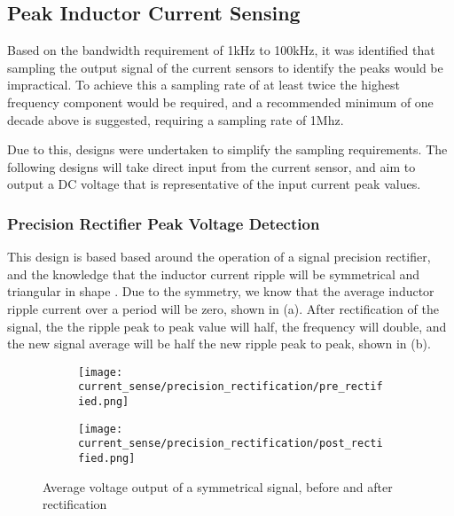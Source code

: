 \subsection{Peak Inductor Current Sensing}

Based on the bandwidth requirement of 1kHz to 100kHz, it was identified that sampling the output signal of the current sensors to identify the peaks would be impractical. To achieve this a sampling rate of at least twice the highest frequency component would be required, and a recommended minimum of one decade above is suggested, requiring a sampling rate of 1Mhz. 

Due to this, designs were undertaken to simplify the sampling requirements. The following designs will take direct input from the current sensor, and aim to output a DC voltage that is representative of the input current peak values. 


\subsubsection*{Precision Rectifier Peak Voltage Detection}\label{S:current_sense_precision_rectifier_design}

This design is based based around the operation of a signal precision rectifier, and the knowledge that the inductor current ripple will be symmetrical and triangular in shape \cite{Mohan2012_Design}. Due to the symmetry, we know that the average inductor ripple current over a period will be zero, shown in  (a). After rectification of the signal, the the ripple peak to peak value will half, the frequency will double, and the new signal average will be half the new ripple peak to peak, shown in  (b). 

\begin{figure}[H]
    
    \centering
    \begin{subfigure}{0.49\textwidth}
        \texttt{[image: current\_sense/precision\_rectification/pre\_rectified.png]}
    \end{subfigure}
    \begin{subfigure}{0.49\textwidth}
        \texttt{[image: current\_sense/precision\_rectification/post\_rectified.png]}
    \end{subfigure}
    \caption{Average voltage output of a symmetrical signal, before and after rectification}
    \label{F:rectification}
\end{figure}

